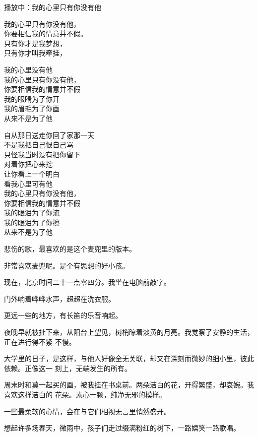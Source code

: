 \documentclass[12pt,a4paper]{article}
\begin{document}
		播放中：我的心里只有你没有他

		\indentenv{4\ccwd}{0\ccwd}{}
		我的心里只有你没有他，\\
		你要相信我的情意并不假。\\
		只有你才是我梦想，\\
		只有你才叫我牵挂，

		我的心里没有他 \\
		我的心里只有你没有他，\\
		你要相信我的情意并不假 \\
		我的眼睛为了你开 \\
		我的眉毛为了你画 \\
		从来不是为了他

		自从那日送走你回了家那一天 \\
		不是我把自己恨自己骂 \\
		只怪我当时没有把你留下 \\
		对着你把心来挖 \\
		让你看上一个明白 \\
		看我心里可有他 \\
		我的心里只有你没有他，\\
		你要相信我的情意并不假 \\
		我的眼泪为了你流 \\
		我的眼泪为了你擦 \\
		从来不是为了他
		\endindentenv


		悲伤的歌，最喜欢的是这个麦兜里的版本。

		非常喜欢麦兜呢。是个有思想的好小孩。

	\endwriting



		现在，北京时间二十一点零四分。我坐在电脑前敲字。\par
		门外响着哗哗水声，超超在洗衣服。\par
		更远一些的地方，有长笛的乐音响起。

		夜晚早就被扯下来，从阳台上望见，树梢晾着淡黄的月亮。我觉察了安静的生活，正在进行得不紧
	不慢。

		大学里的日子，是这样，与他人好像全无关联，却又在深刻而微妙的细小里，彼此依赖。正像这一
	刻上，无端发生的所有。


		周末时和莫一起买的画，被我挂在书桌前。两朵洁白的花，开得繁盛，却哀婉。我喜欢这样洁白的
	花朵。素心一颗，纯净无邪的模样。

		一些最柔软的心情，会在与它们相视无言里悄然盛开。

		想起许多场春天，微雨中，孩子们走过缀满粉红的树下，一路嬉笑一路歌唱。
\end{document}
